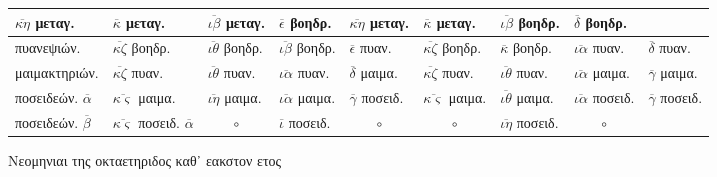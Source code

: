 \begin{tabular}{@{}l llllllll@{}}
$\overline{\kappa\eta}$      \textgreek{μεταγ.} &
$\overline{\kappa}$          \textgreek{μεταγ.} &
$\overline{\iota\beta}$      \textgreek{μεταγ.} &
$\overline{\epsilon}$        \textgreek{βοηδρ.} &
$\overline{\kappa\eta}$      \textgreek{μεταγ.} &
$\overline{\kappa}$          \textgreek{μεταγ.} &
$\overline{\iota\beta}$      \textgreek{βοηδρ.} &
$\overline{\delta}$          \textgreek{βοηδρ.}
\\
\hline
\textgreek{πυανεψιών.} &
$\overline{\kappa\zeta}$     \textgreek{βοηδρ.} &
$\overline{\iota\theta}$     \textgreek{βοηδρ.} &
$\overline{\iota\beta}$      \textgreek{βοηδρ.} &
$\overline{\epsilon}$        \textgreek{πυαν.} &
$\overline{\kappa\zeta}$     \textgreek{βοηδρ.} &
$\overline{\kappa}$          \textgreek{βοηδρ.} &
$\overline{\iota\alpha}$     \textgreek{πυαν.} &
$\overline{\delta}$          \textgreek{πυαν.}
\\
\textgreek{μαιμακτηριών.} &
$\overline{\kappa\zeta}$     \textgreek{πυαν.} &
$\overline{\iota\theta}$     \textgreek{πυαν.} &
$\overline{\iota\alpha}$     \textgreek{πυαν.} &
$\overline{\delta}$          \textgreek{μαιμα.} &
$\overline{\kappa\zeta}$     \textgreek{πυαν.} &
$\overline{\iota\theta}$     \textgreek{πυαν.} &
$\overline{\iota\alpha}$     \textgreek{μαιμα.} &
$\overline{\gamma}$          \textgreek{μαιμα.}
\\
\textgreek{ποσειδεών.} $\overline{\alpha}$&
$\overline{\kappa\varsigma}$ \textgreek{μαιμα.} &
$\overline{\iota\eta}$       \textgreek{μαιμα.} &
$\overline{\iota\alpha}$     \textgreek{μαιμα.} &
$\overline{\gamma}$          \textgreek{ποσειδ.} &
$\overline{\kappa\varsigma}$ \textgreek{μαιμα.} &
$\overline{\iota\theta}$     \textgreek{μαιμα.} &
$\overline{\iota\alpha}$     \textgreek{ποσειδ.} &
$\overline{\gamma}$          \textgreek{ποσειδ.}
\\
\textgreek{ποσειδεών.} $\overline{\beta}$&
$\overline{\kappa\varsigma}$ \textgreek{ποσειδ.} $\overline{\alpha}$ &
    \multicolumn{1}{c}{$\circ$} &
$\overline{\iota}$           \textgreek{ποσειδ.} &
    \multicolumn{1}{c}{$\circ$} &
    \multicolumn{1}{c}{$\circ$} &
$\overline{\iota\eta}$       \textgreek{ποσειδ.} &
    \multicolumn{1}{c}{$\circ$} &
~
\\
\bottomrule
\end{tabular}
%
\caption{\textgreek{Νεομηνιαι της οκταετηριδος καθ᾽ εακστον ετος}}
\label{tab:p067b}
%